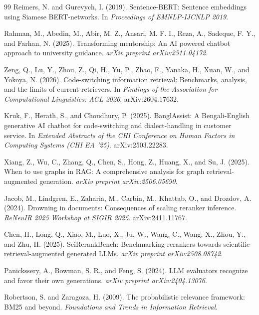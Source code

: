 \documentclass[a4paper,twoside]{article}
\begin{document}
{\begin{thebibliography}{99}
 Reimers, N. and Gurevych, I. (2019). Sentence-BERT: Sentence embeddings using Siamese BERT-networks. In \textit{Proceedings of EMNLP-IJCNLP 2019}.

 Rahman, M., Abedin, M., Abir, M. Z., Ansari, M. F. I., Reza, A., Sadeque, F. Y., and Farhan, N. (2025). Transforming mentorship: An AI powered chatbot approach to university guidance. \textit{arXiv preprint arXiv:2511.04172}.

 Zeng, Q., Lu, Y., Zhou, Z., Qi, H., Yu, P., Zhao, F., Yanaka, H., Xuan, W., and Yokoya, N. (2026). Code-switching information retrieval: Benchmarks, analysis, and the limits of current retrievers. In \textit{Findings of the Association for Computational Linguistics: ACL 2026}. arXiv:2604.17632.

 Kruk, F., Herath, S., and Choudhury, P. (2025). BanglAssist: A Bengali-English generative AI chatbot for code-switching and dialect-handling in customer service. In \textit{Extended Abstracts of the CHI Conference on Human Factors in Computing Systems (CHI EA '25)}. arXiv:2503.22283.

 Xiang, Z., Wu, C., Zhang, Q., Chen, S., Hong, Z., Huang, X., and Su, J. (2025). When to use graphs in RAG: A comprehensive analysis for graph retrieval-augmented generation. \textit{arXiv preprint arXiv:2506.05690}.

 Jacob, M., Lindgren, E., Zaharia, M., Carbin, M., Khattab, O., and Drozdov, A. (2024). Drowning in documents: Consequences of scaling reranker inference. \textit{ReNeuIR 2025 Workshop at SIGIR 2025}. arXiv:2411.11767.

 Chen, H., Long, Q., Xiao, M., Luo, X., Ju, W., Wang, C., Wang, X., Zhou, Y., and Zhu, H. (2025). SciRerankBench: Benchmarking rerankers towards scientific retrieval-augmented generated LLMs. \textit{arXiv preprint arXiv:2508.08742}.

 Panickssery, A., Bowman, S. R., and Feng, S. (2024). LLM evaluators recognize and favor their own generations. \textit{arXiv preprint arXiv:2404.13076}.

 Robertson, S. and Zaragoza, H. (2009). The probabilistic relevance framework: BM25 and beyond. \textit{Foundations and Trends in Information Retrieval}.


\end{thebibliography}}
\end{document}
